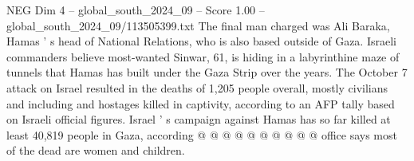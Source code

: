 \begin{textsample}{NEG Dim 4 – global\_south\_2024\_09 – Score 1.00 – global\_south\_2024\_09/113505399.txt}
The final man charged was Ali Baraka, Hamas ' s head of National Relations, who is also based outside of Gaza.
Israeli commanders believe most-wanted Sinwar, 61, is hiding in a labyrinthine maze of tunnels that Hamas has built under the Gaza Strip over the years.
The October 7 attack on Israel resulted in the deaths of 1,205 people overall, mostly civilians and including and hostages killed in captivity, according to an AFP tally based on Israeli official figures.
Israel ' s campaign against Hamas has so far killed at least 40,819 people in Gaza, according @ @ @ @ @ @ @ @ @ @ office says most of the dead are women and children.

\end{textsample}
